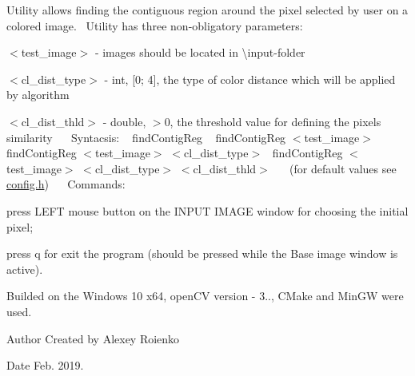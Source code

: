 Utility allows finding the contiguous region around the pixel selected by user on a colored image.~\newline
Utility has three non-\/obligatory parameters\+:~\newline

\begin{DoxyEnumerate}
\item $<$test\+\_\+image$>$ -\/ images should be located in \textquotesingle{}\textbackslash{}input\textquotesingle{}-\/folder~\newline

\item $<$cl\+\_\+dist\+\_\+type$>$ -\/ int, \mbox{[}0; 4\mbox{]}, the type of color distance which will be applied by algorithm~\newline

\item $<$cl\+\_\+dist\+\_\+thld$>$ -\/ double, $>$0, the threshold value for defining the pixels similarity~\newline
~\newline
Syntacsis\+: ~\newline
 find\+Contig\+Reg ~\newline
 find\+Contig\+Reg $<$test\+\_\+image$>$~\newline
 find\+Contig\+Reg $<$test\+\_\+image$>$ $<$cl\+\_\+dist\+\_\+type$>$~\newline
 find\+Contig\+Reg $<$test\+\_\+image$>$ $<$cl\+\_\+dist\+\_\+type$>$ $<$cl\+\_\+dist\+\_\+thld$>$~\newline
 ~\newline
 (for default values see \mbox{\hyperlink{config_8h}{config.\+h}})~\newline
 ~\newline
Commands\+: ~\newline

\end{DoxyEnumerate}
\begin{DoxyItemize}
\item press L\+E\+FT mouse button on the I\+N\+P\+UT I\+M\+A\+GE window for choosing the initial pixel;~\newline

\item press \textquotesingle{}q\textquotesingle{} for exit the program (should be pressed while the \textquotesingle{}Base image\textquotesingle{} window is active).
\end{DoxyItemize}

Builded on the Windows 10 x64, open\+CV version -\/ 3.., C\+Make and Min\+GW were used.

\begin{DoxyAuthor}{Author}
Created by Alexey Roienko
\end{DoxyAuthor}
\begin{DoxyDate}{Date}
Feb. 2019. 
\end{DoxyDate}

